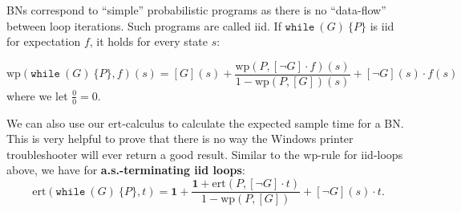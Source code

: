 \documentclass[english]{panikzettel}
\newcommand{\stmtWhile}[2]{\texttt{while}~(#1)~\{ #2 \}}
\renewcommand{\wp}{\mathrm{wp}}
\newcommand{\ert}{\mathrm{ert}}
\begin{document}
BNs correspond to ``simple'' probabilistic programs as there is no ``data-flow'' between loop iterations. Such programs are called iid. If $\stmtWhile{G}{P}$ is iid for expectation $f$, it holds for every state $s$:

\[
    \wp(\stmtWhile{G}{P},f)(s) = [G](s) + \frac{\wp(P, [\neg G] \cdot f)(s)}{1 - \wp(P,[G])(s)} + [\neg G](s) \cdot f(s)
\]
where we let $\frac{0}{0}=0$.

We can also use our $\ert$-calculus to calculate the expected sample time for a BN.
This is very helpful to prove that there is no way the Windows printer troubleshooter will ever return a good result.
Similar to the $\wp$-rule for iid-loops above, we have for \textbf{a.s.-terminating iid loops}:
\[
    \ert(\stmtWhile{G}{P},t) = \mathbf{1} + \frac{\mathbf{1} + \ert(P, [\neg G] \cdot t)}{1 - \wp(P,[G])} + [\neg G](s) \cdot t.
\]
\end{document}
